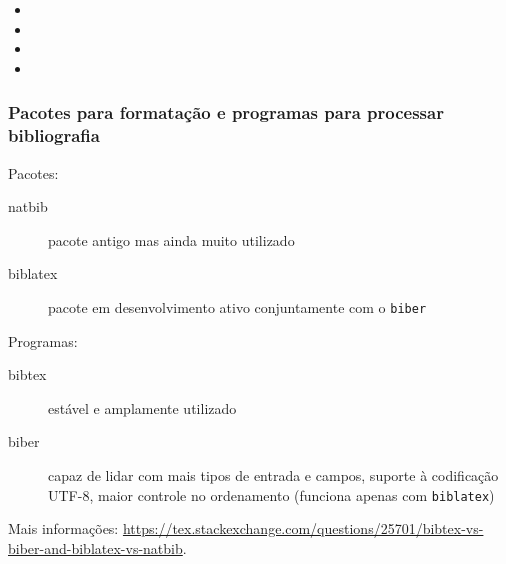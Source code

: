 \begin{frame}
\framebreak

\begin{itemize}
\item {}
\item {}
\item {}
\item {}
\end{itemize}

\end{frame}



\begin{frame}
\frametitle{Pacotes para formatação e programas para processar bibliografia}
Pacotes:
\begin{description}
\item[natbib] pacote antigo mas ainda muito utilizado 
\item[biblatex] pacote em desenvolvimento ativo conjuntamente com o \texttt{biber}
\end{description}

Programas:
\begin{description}
\item[bibtex] estável e amplamente utilizado
\item[biber] capaz de lidar com mais tipos de entrada e campos, suporte à codificação UTF-8, maior controle no ordenamento (funciona apenas com \texttt{biblatex})
\end{description}

Mais informações: \url{https://tex.stackexchange.com/questions/25701/bibtex-vs-biber-and-biblatex-vs-natbib}.
\end{frame}


